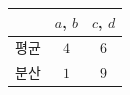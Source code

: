 {\renewcommand{\arraystretch}{1.3}\small
\begin{tabular}{|c|c|c|}
\hline
 & $a$, $b$ & $c$, $d$ \\ \hline
평균 & $4$ & $6$ \\ \hline
분산 & $1$ & $9$ \\ \hline
\end{tabular}}
